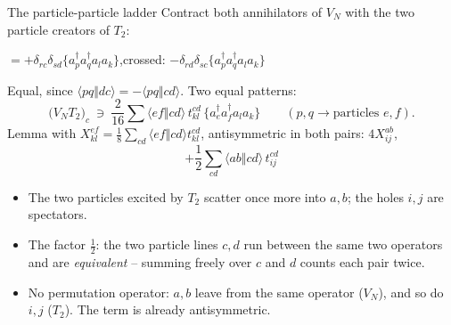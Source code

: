 \documentclass[aspectratio=169,10pt]{beamer}
\newcommand{\cre}[1]{a_{#1}^{\dagger}}
\newcommand{\ann}[1]{a_{#1}}
\newcommand{\no}[1]{\bigl\{#1\bigr\}}
\newcommand{\as}[4]{\langle #1#2\Vert #3#4\rangle}
\begin{document}
\begin{frame}[shrink=12]{The particle-particle ladder}
\small
Contract both annihilators of $V_N$ with the two particle creators of $T_2$:
\begin{center}
$=+\delta_{rc}\delta_{sd}\no{\cre p\cre q\ann l\ann k}$,\qquad crossed: $-\delta_{rd}\delta_{sc}\no{\cre p\cre q\ann l\ann k}$
\end{center}
Equal, since $\as pqdc=-\as pqcd$. Two equal patterns:
\[
 \bigl(V_NT_2\bigr)_c\ \ni\ \frac{2}{16}\sum\as efcd\,t_{kl}^{cd}\,\no{\cre e\cre f\ann l\ann k}
 \qquad(p,q\to\text{particles }e,f).
\]
Lemma with $X_{kl}^{ef}=\tfrac18\sum_{cd}\as efcd t_{kl}^{cd}$, antisymmetric in both pairs: $4X_{ij}^{ab}$,
\[
 \boxed{+\frac12\sum_{cd}\as abcd\,t_{ij}^{cd}}
\]
\begin{itemize}
\item The two particles excited by $T_2$ scatter once more into $a,b$; the holes $i,j$ are spectators.
\item The factor $\tfrac12$: the two particle lines $c,d$ run between the same two operators and are \emph{equivalent} -- summing freely over $c$ and $d$ counts each pair twice.
\item No permutation operator: $a,b$ leave from the same operator ($V_N$), and so do $i,j$ ($T_2$). The term is already antisymmetric.
\end{itemize}
\end{frame}
\end{document}
